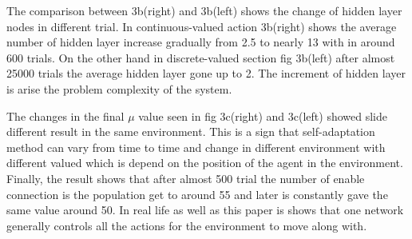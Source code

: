 \documentclass[12pt]{article}
\begin{document}
The comparison between 3b(right) and 3b(left) shows the change of hidden layer nodes in different trial.  In continuous-valued action 3b(right) shows the average number of hidden layer increase gradually from 2.5 to nearly 13 with in around 600 trials. On the other hand in discrete-valued section fig 3b(left) after almost 25000 trials the average hidden layer gone up to 2. The increment of hidden layer is arise the problem complexity of the system. 

The changes in the final $\mu$ value seen in fig 3c(right) and 3c(left) showed slide different result in the same environment. This is a sign that self-adaptation method can vary from time to time and change in different environment with different valued which is depend on the position of the agent in the environment. Finally, the result shows that after almost 500 trial the number of enable connection is the population get to around 55 and later is constantly gave the same value around 50. In real life as well as this paper is shows that one network generally controls all the actions for the environment to move along with.
\end{document}
